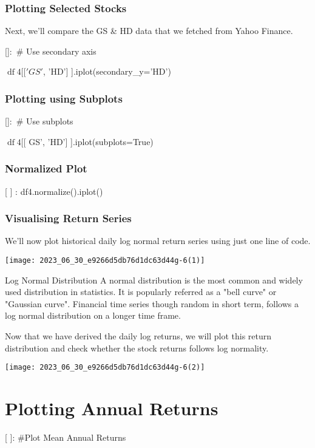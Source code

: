 \documentclass[10pt]{article}
\begin{document}
\subsubsection*{Plotting Selected Stocks}
Next, we'll compare the GS \& HD data that we fetched from Yahoo Finance.

[]$:$ \# Use secondary axis

$\operatorname{df} 4[[' G S '$, 'HD'] ].iplot(secondary\_y='HD')

\subsubsection*{Plotting using Subplots}
[]$:$ \# Use subplots

$\operatorname{df} 4[[$ GS', 'HD'] ].iplot(subplots=True)

\subsubsection*{Normalized Plot}
[ ] : df4.normalize().iplot()

\subsubsection*{Visualising Return Series}
We'll now plot historical daily log normal return series using just one line of code.

\begin{center}
\texttt{[image: 2023\_06\_30\_e9266d5db76d1dc63d44g-6(1)]}
\end{center}

Log Normal Distribution A normal distribution is the most common and widely used distribution in statistics. It is popularly referred as a "bell curve" or "Gaussian curve". Financial time series though random in short term, follows a log normal distribution on a longer time frame.

Now that we have derived the daily log returns, we will plot this return distribution and check whether the stock returns follows log normality.

\begin{center}
\texttt{[image: 2023\_06\_30\_e9266d5db76d1dc63d44g-6(2)]}
\end{center}

\section*{Plotting Annual Returns}
[ ]: \#Plot Mean Annual Returns
\end{document}

